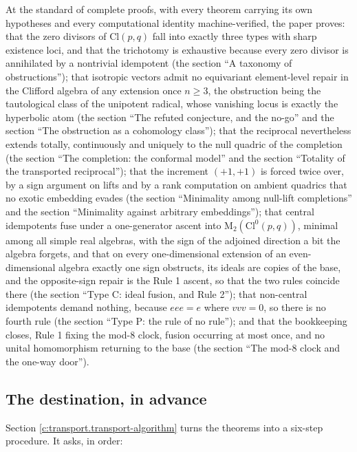 \documentclass[11pt]{article}
\theoremstyle{definition}
\theoremstyle{plain}
\providecommand{\Cl}{}\renewcommand{\Cl}{\mathrm{Cl}}
\providecommand{\Mat}{}\renewcommand{\Mat}{\mathrm{M}}
\begin{document}
At the standard of complete proofs, with every theorem carrying its own hypotheses and every computational identity machine-verified, the paper proves: that the zero divisors of $\Cl(p,q)$ fall into exactly three types with sharp existence loci, and that the trichotomy is exhaustive because every zero divisor is annihilated by a nontrivial idempotent (the section ``A taxonomy of obstructions''); that isotropic vectors admit no equivariant element-level repair in the Clifford algebra of any extension once $n \geq 3$, the obstruction being the tautological class of the unipotent radical, whose vanishing locus is exactly the hyperbolic atom (the section ``The refuted conjecture, and the no-go'' and the section ``The obstruction as a cohomology class''); that the reciprocal nevertheless extends totally, continuously and uniquely to the null quadric of the completion (the section ``The completion: the conformal model'' and the section ``Totality of the transported reciprocal''); that the increment $(+1,+1)$ is forced twice over, by a sign argument on lifts and by a rank computation on ambient quadrics that no exotic embedding evades (the section ``Minimality among null-lift completions'' and the section ``Minimality against arbitrary embeddings''); that central idempotents fuse under a one-generator ascent into $\Mat_2(\Cl^0(p,q))$, minimal among all simple real algebras, with the sign of the adjoined direction a bit the algebra forgets, and that on every one-dimensional extension of an even-dimensional algebra exactly one sign obstructs, its ideals are copies of the base, and the opposite-sign repair is the Rule 1 ascent, so that the two rules coincide there (the section ``Type C: ideal fusion, and Rule 2''); that non-central idempotents demand nothing, because $eee = e$ where $vvv = 0$, so there is no fourth rule (the section ``Type P: the rule of no rule''); and that the bookkeeping closes, Rule 1 fixing the mod-8 clock, fusion occurring at most once, and no unital homomorphism returning to the base (the section ``The mod-8 clock and the one-way door'').

\subsection*{The destination, in advance}
\label{c:note.transport.setting-destination-advance}
Section \ref{c:transport.transport-algorithm} turns the theorems into a six-step procedure. It asks, in order:
\end{document}
